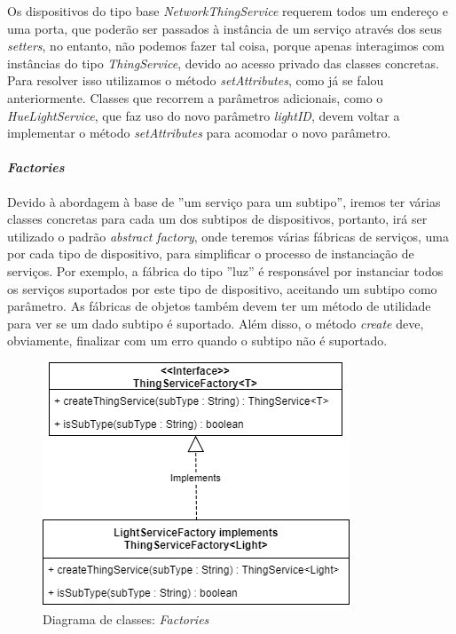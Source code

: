 Os dispositivos do tipo base \textit{NetworkThingService} requerem todos um endereço e uma porta, que poderão ser passados à instância de um serviço através dos seus \textit{setters}, no entanto, não podemos fazer tal coisa, porque apenas interagimos com instâncias do tipo \textit{ThingService}, devido ao acesso privado das classes concretas. Para resolver isso utilizamos o método \textit{setAttributes}, como já se falou anteriormente. Classes que recorrem a parâmetros adicionais, como o \textit{HueLightService}, que faz uso do novo parâmetro \textit{lightID}, devem voltar a implementar o método \textit{setAttributes} para acomodar o novo parâmetro.

%
%
%
%

\paragraph*{\textit{Factories}}

Devido à abordagem à base de ''um serviço para um subtipo'', iremos ter várias classes concretas para cada um dos subtipos de dispositivos, portanto, irá ser utilizado o padrão \textit{abstract factory}, onde teremos várias fábricas de serviços, uma por cada tipo de dispositivo, para simplificar o processo de instanciação de serviços. Por exemplo, a fábrica do tipo ''luz'' é responsável por instanciar todos os serviços suportados por este tipo de dispositivo, aceitando um subtipo como parâmetro. As fábricas de objetos também devem ter um método de utilidade para ver se um dado subtipo é suportado. Além disso, o método \textit{create} deve, obviamente, finalizar com um erro quando o subtipo não é suportado.

\begin{figure}[H]
  \centering
        \includegraphics[scale=0.75]{img/hub-factories.png}
  \caption{Diagrama de classes: \textit{Factories}}
\end{figure}

